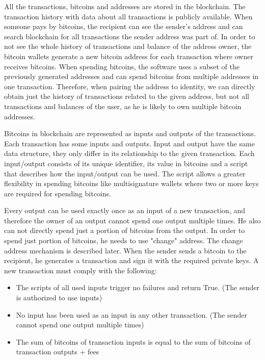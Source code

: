 \documentclass[
  digital, %
  table,   %
  lof,     %
  lot,     %
  oneside
]{fithesis3}
\begin{document}
All the transactions, bitcoins and addresses are stored in the blockchain.
The transaction history with data about all transactions is publicly available.
When someone pays by bitcoins, the recipient can see the sender's address
and can search blockchain for all transactions the sender address was part of.
In order to not see the whole history of transactions and balance of the address owner,
the bitcoin wallets generate a new bitcoin address for each transaction where
owner receives bitcoins.
When spending bitcoins, the software uses a subset of the previously generated addresses and
can spend bitcoins from multiple addresses in one transaction.
Therefore, when pairing the address to identity,
we can directly obtain just the history of transactions related to the given
address, but not all transactions and balances of the user,
as he is likely to own multiple bitcoin addresses.

Bitcoins in blockchain are represented as inputs and outputs of the transactions.
Each transaction has some inputs and outputs. 
Input and output have the same data structure,
they only differ in its relationship to the given transaction.
Each input/output consists of its unique identifier, its value in bitcoins
and a script that describes how the input/output can be used.
The script allows a greater flexibility in spending bitcoins like multisignature wallets where
two or more keys are required for spending bitcoins.

Every output can be used exactly once as an input of a new transaction,
and therefore the owner of an output cannot
spend one output multiple times. He also can not directly
spend just a portion of bitcoins from the output. In order to spend just portion of bitcoins,
he needs to use "change" address. The change address mechanism is described later.
When the sender sends a bitcoin to the recipient, he generates a transaction
and sign it with the required private keys.
A new transaction must comply with the following:

\begin{itemize}
  \item The scripts of all used inputs trigger no failures and return True. (The sender is authorized to use inputs)
  \item No input has been used as an input in any other transaction. \newline (The sender cannot spend one output multiple times)
  \item The sum of bitcoins of transaction inputs is equal to the sum of bitcoins of transaction outputs + fees
\end{itemize}
\end{document}
